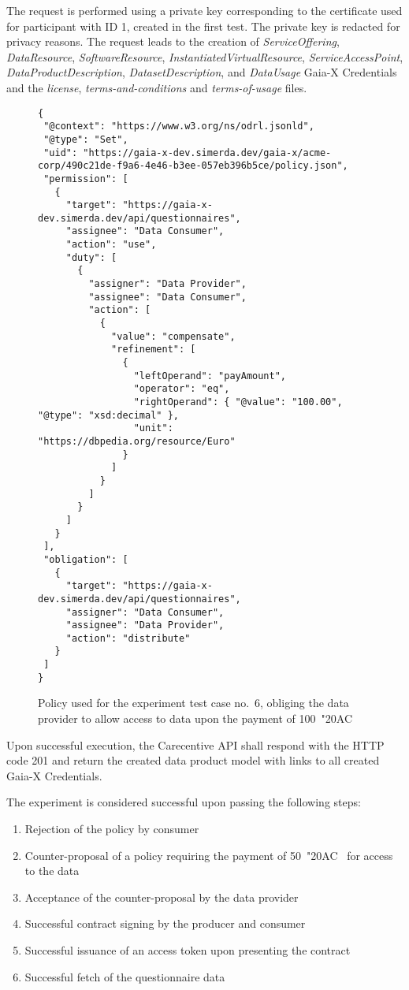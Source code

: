 The request is performed using a private key corresponding to the certificate used for participant with ID 1, created in the first test.
The private key is redacted for privacy reasons.
The request leads to the creation of \textit{ServiceOffering}, \textit{DataResource}, \textit{SoftwareResource}, \textit{InstantiatedVirtualResource}, \textit{ServiceAccessPoint}, \textit{DataProductDescription}, \textit{DatasetDescription}, and \textit{DataUsage} Gaia-X Credentials and the \textit{license}, \textit{terms-and-conditions} and \textit{terms-of-usage} files.

\begin{figure}[h]
    \centering
    \begin{verbatim}
{
 "@context": "https://www.w3.org/ns/odrl.jsonld",
 "@type": "Set",
 "uid": "https://gaia-x-dev.simerda.dev/gaia-x/acme-corp/490c21de-f9a6-4e46-b3ee-057eb396b5ce/policy.json",
 "permission": [
   {
     "target": "https://gaia-x-dev.simerda.dev/api/questionnaires",
     "assignee": "Data Consumer",
     "action": "use",
     "duty": [
       {
         "assigner": "Data Provider",
         "assignee": "Data Consumer",
         "action": [
           {
             "value": "compensate",
             "refinement": [
               {
                 "leftOperand": "payAmount",
                 "operator": "eq",
                 "rightOperand": { "@value": "100.00", "@type": "xsd:decimal" },
                 "unit": "https://dbpedia.org/resource/Euro"
               }
             ]
           }
         ]
       }
     ]
   }
 ],
 "obligation": [
   {
     "target": "https://gaia-x-dev.simerda.dev/api/questionnaires",
     "assigner": "Data Consumer",
     "assignee": "Data Provider",
     "action": "distribute"
   }
 ]
}
    \end{verbatim}
    \caption{Policy used for the experiment test case no.~6, obliging the data provider to allow access to data upon the payment of 100~\char"20AC~}\label{fig:test_case_6_policy}
\end{figure}

Upon successful execution, the Carecentive API shall respond with the HTTP code 201 and return the created data product model with links to all created Gaia-X Credentials.

The experiment is considered successful upon passing the following steps:
\begin{enumerate}
    \item Rejection of the policy by consumer
    \item Counter-proposal of a policy requiring the payment of 50~\char"20AC~ for access to the data
    \item Acceptance of the counter-proposal by the data provider
    \item Successful contract signing by the producer and consumer
    \item Successful issuance of an access token upon presenting the contract
    \item Successful fetch of the questionnaire data
\end{enumerate}

